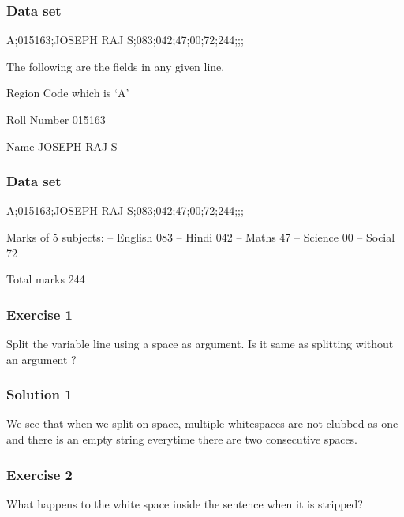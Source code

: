 \documentclass[17pt,compress]{beamer}
\begin{document}
\begin{frame}
\frametitle{Data set}
\label{sec-4.1}

A;015163;JOSEPH RAJ S;083;042;47;00;72;244;;;\pause

  The following are the fields in any given line.\pause
\begin{itemize}
\begin{small}
\item Region Code which is `A'\pause
\item Roll Number 015163\pause
\item Name JOSEPH RAJ S
\end{small}
\end{itemize}
\end{frame}
\begin{frame}
\frametitle{Data set}
\label{sec-4.2}

 A;015163;JOSEPH RAJ S;083;042;47;00;72;244;;;


\begin{itemize}
\begin{small}
\item Marks of 5 subjects: -- English 083 -- 
     Hindi 042 -- Maths 47 --
     Science 00 -- Social 72\pause
\item Total marks 244
\end{small}
\end{itemize}
\end{frame}
\begin{frame}
\frametitle{Exercise 1}
\label{sec-5}
Split the variable line using a space as argument. Is it same as splitting without an argument ?

\end{frame}
\begin{frame}
\frametitle{Solution 1}
\label{sec-6}

  We see that when we split on space, multiple whitespaces are not
  clubbed as one and there is an empty string everytime there are two
  consecutive spaces.
\end{frame}
\begin{frame}
\frametitle{Exercise 2}
\label{sec-7}

  What happens to the white space inside the sentence when it is
  stripped? 
\end{frame}
\end{document}

